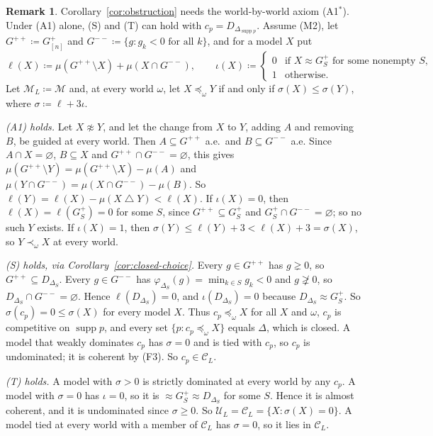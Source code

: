 \documentclass[11pt]{article}
\theoremstyle{definition}
\newtheorem{remark}[theorem]{Remark}
\newcommand{\supp}{\operatorname{supp}}
\newcommand{\Cc}{\mathcal C}
\newcommand{\Mc}{\mathcal M}
\newcommand{\Uc}{\mathcal U}
\newcommand{\sd}{\mathbin{\triangle}}
\newcommand{\gneqz}{\gneq 0}
\begin{document}
\begin{remark}\label{rem:A1-only}
Corollary~\ref{cor:obstruction} needs the world-by-world axiom (A1$^*$). Under (A1) alone, (S) and (T) can hold with $c_p=D_{\Delta_{\supp p}}$. Assume (M2), let $G^{++}\coloneqq G^+_{[n]}$ and $G^{--}\coloneqq\{g:g_k<0\text{ for all }k\}$, and for a model $X$ put
\[
\ell(X)\coloneqq\mu(G^{++}\setminus X)+\mu(X\cap G^{--}),\qquad
\iota(X)\coloneqq\begin{cases}0&\text{if }X\approx G_S^+\text{ for some nonempty }S,\\1&\text{otherwise.}\end{cases}
\]
Let $\Mc_L\coloneqq\Mc$ and, at every world $\omega$, let $X\preceq_\omega Y$ if and only if $\sigma(X)\le\sigma(Y)$, where $\sigma\coloneqq\ell+3\iota$.

\emph{(A1) holds.} Let $X\not\approx Y$, and let the change from $X$ to $Y$, adding $A$ and removing $B$, be guided at every world. Then $A\subseteq G^{++}$ a.e.\ and $B\subseteq G^{--}$ a.e. Since $A\cap X=\varnothing$, $B\subseteq X$ and $G^{++}\cap G^{--}=\varnothing$, this gives $\mu(G^{++}\setminus Y)=\mu(G^{++}\setminus X)-\mu(A)$ and $\mu(Y\cap G^{--})=\mu(X\cap G^{--})-\mu(B)$. So $\ell(Y)=\ell(X)-\mu(X\sd Y)<\ell(X)$. If $\iota(X)=0$, then $\ell(X)=\ell(G_S^+)=0$ for some $S$, since $G^{++}\subseteq G_S^+$ and $G_S^+\cap G^{--}=\varnothing$; so no such $Y$ exists. If $\iota(X)=1$, then $\sigma(Y)\le\ell(Y)+3<\ell(X)+3=\sigma(X)$, so $Y\prec_\omega X$ at every world.

\emph{(S) holds, via Corollary~\ref{cor:closed-choice}.} Every $g\in G^{++}$ has $g\gneqz$, so $G^{++}\subseteq D_{\Delta_S}$. Every $g\in G^{--}$ has $\varphi_{\Delta_S}(g)=\min_{k\in S}g_k<0$ and $g\not\gneqz$, so $D_{\Delta_S}\cap G^{--}=\varnothing$. Hence $\ell(D_{\Delta_S})=0$, and $\iota(D_{\Delta_S})=0$ because $D_{\Delta_S}\approx G_S^+$. So $\sigma(c_p)=0\le\sigma(X)$ for every model $X$. Thus $c_p\preceq_\omega X$ for all $X$ and $\omega$, $c_p$ is competitive on $\supp p$, and every set $\{p:c_p\preceq_\omega X\}$ equals $\Delta$, which is closed. A model that weakly dominates $c_p$ has $\sigma=0$ and is tied with $c_p$, so $c_p$ is undominated; it is coherent by (F3). So $c_p\in\Cc_L$.

\emph{(T) holds.} A model with $\sigma>0$ is strictly dominated at every world by any $c_p$. A model with $\sigma=0$ has $\iota=0$, so it is $\approx G_S^+\approx D_{\Delta_S}$ for some $S$. Hence it is almost coherent, and it is undominated since $\sigma\ge0$. So $\Uc_L=\Cc_L=\{X:\sigma(X)=0\}$. A model tied at every world with a member of $\Cc_L$ has $\sigma=0$, so it lies in $\Cc_L$.
\end{remark}
\end{document}
